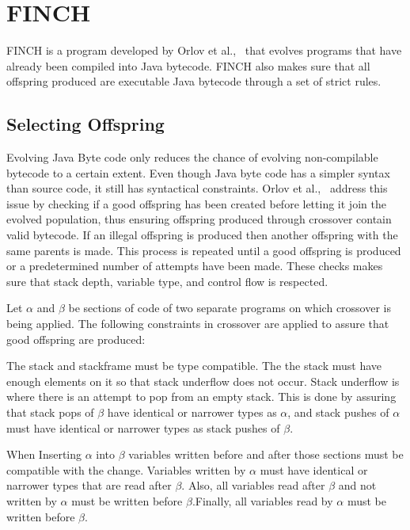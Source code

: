 \documentclass{sig-alternate}
\begin{document}
\section{FINCH}
FINCH is a program developed by Orlov et al.,~\cite{FINCH2:2009,FINCH:2011} that evolves programs that have already been compiled into Java bytecode. FINCH also makes sure that all offspring produced are executable Java bytecode through a set of strict rules. 

\subsection{Selecting Offspring}
Evolving Java Byte code only reduces the chance of evolving non-compilable bytecode to a certain extent. Even though Java byte code has a simpler syntax than source code, it still has syntactical constraints. Orlov et al.,~\cite{FINCH2:2009} address this issue by checking if a good offspring has been created before letting it join the evolved population, thus ensuring offspring produced through crossover contain valid bytecode. If an illegal offspring is produced then another offspring with the same parents is made. This process is repeated until a good offspring is produced or a predetermined number of attempts have been made. These checks makes sure that stack depth, variable type, and control flow is respected.\par

Let $\alpha$ and $\beta$ be sections of code of two separate programs on which crossover is being applied.
The following constraints in crossover are applied to assure that good offspring are produced:\par

The stack and stackframe must be type compatible. The the stack must have enough elements on it so that stack underflow does not occur. Stack underflow is where there is an attempt to pop from an empty stack. This is done by assuring that stack pops of $\beta$ have identical or narrower types as $\alpha$, and stack pushes of $\alpha$ must have identical or narrower types as stack pushes of $\beta$. \par


When Inserting $\alpha$ into $\beta$ variables written before and after those sections must be compatible with the change. Variables written by $\alpha$ must have identical or narrower types that are read after $\beta$. Also, all variables read after $\beta$ and not written by $\alpha$ must be written before $\beta$.Finally, all variables read by $\alpha$ must be written before $\beta$.\par
\end{document}
